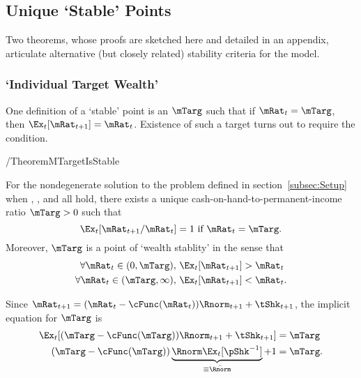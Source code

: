 \documentclass[BufferStockTheory]{subfiles}
\begin{document}
\subsection{Unique `Stable' Points}

Two theorems, whose proofs are sketched here and detailed in an appendix, articulate alternative (but closely related) stability criteria for the model.

\label{subsec:onetarget}
\hypertarget{TheoremTarget}{}


\subsubsection{`Individual Target Wealth'} \label{subsubsec:mTarget}
One definition of a `stable' point is an $\mTarg$ such that if $\mRat_{t}=\mTarg$, then $\Ex_{t}[\mRat_{t+1}]=\mRat_{t}$.  Existence of such a target turns out to require the {\GICNrm} condition.

\begin{verbatimwrite}{\EqDir/TheoremMTargetIsStable}
\begin{theorem}\label{thm:target}
  For the nondegenerate solution to the problem defined in section~\ref{subsec:Setup} when {\FVAC}, {\WRIC}, and {\GICNrm} all hold, there exists a unique cash-on-hand-to-permanent-income ratio $\mTarg>0$ such that
  \begin{equation}  
    \Ex_t [{\mRat}_{t+1}/\mRat_t] = 1 \mbox{~if~} \mRat_t = \mTarg. 
    \label{eq:mTarget}
  \end{equation}
  Moreover, $\mTarg$ is a point of `wealth stablity' in the sense that
  \begin{align}\label{eq:stability}
    \forall {\mRat}_t\in(0,\mTarg),      \,\,& \Ex_t [{\mRat}_{t+1}] > {\mRat}_t  \\
    \forall {\mRat}_t\in(\mTarg,\infty), \,\,& \Ex_t [{\mRat}_{t+1}] < {\mRat}_t. \notag
  \end{align}
  \end{theorem}
\end{verbatimwrite}


 \hypertarget{mTargImplicit}{}
 
 Since $\mRat_{t+1}=(\mRat_{t}-\cFunc(\mRat_{t}))\Rnorm_{t+1}+\tShk_{t+1}$, the implicit equation for $\mTarg$ is
 \begin{align}
  \Ex_{t}[(\mTarg-\cFunc(\mTarg))\Rnorm_{t+1}+\tShk_{t+1}] & = \mTarg \label{eq:mTargImplicit}
\\   (\mTarg-\cFunc(\mTarg))\underbrace{\Rnorm\Ex_{t}[\pShk^{-1}]}_{\equiv \bar{\Rnorm}}+1 & = \mTarg \notag.
 \end{align}
 
\end{document}
